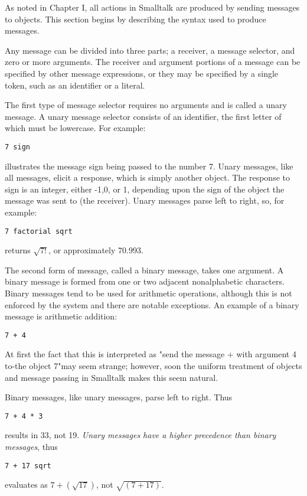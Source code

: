 
As noted in Chapter I, all actions in Smalltalk are produced by sending
messages to objects. This section begins by describing the syntax used to
produce messages.

Any message can be divided into three parts; a receiver, a message
selector, and zero or more arguments. The receiver and argument portions
of a message can be specified by other message expressions, or they may
be specified by a single token, such as an identifier or a literal.

The first type of message selector requires no arguments and is called
a unary message. A unary message selector consists of an identifier, the
first letter of which must be lowercase. For example:
\begin{lstlisting}
7 sign
\end{lstlisting}
illustrates the message sign being passed to the number 7. Unary messages,
like all messages, elicit a response, which is simply another object. The
response to sign is an integer, either -1,0, or 1, depending upon the sign
of the object the message was sent to (the receiver). Unary messages parse
left to right, so, for example:
\begin{lstlisting}
7 factorial sqrt
\end{lstlisting}
returns $\sqrt{7!}$, or approximately 70.993.    

The second form of message, called a binary message, takes one argument. 
A binary message is formed from one or two adjacent nonalphabetic characters.
Binary messages tend to be used for arithmetic
operations, although this is not enforced by the system and there are
notable exceptions. An example of a binary message is arithmetic addition:
\begin{lstlisting}
7 + 4
\end{lstlisting}
At first the fact that this is interpreted as "send the message + with
argument 4 to-the object 7"may seem strange; however, soon the uniform
treatment of objects and message passing in Smalltalk makes this seem
natural.

Binary messages, like unary messages, parse left to right. Thus
\begin{lstlisting}
7 + 4 * 3
\end{lstlisting}
results in 33, not 19. \emph{Unary messages have a higher precedence than binary
messages}, thus
\begin{lstlisting}
7 + 17 sqrt
\end{lstlisting}
evaluates as $7 + (\sqrt{17})$, not $\sqrt{(7 + 17)}$.


